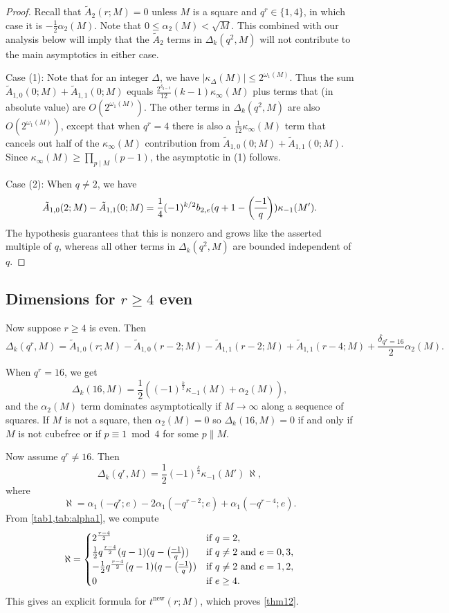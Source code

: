 \documentclass[11pt]{amsart}
\newcommand{\new}{\mathrm{new}}
\renewcommand{\mod}{\bmod}
\newcommand{\leg}{\overwithdelims ()}
\numberwithin{lem}{section}
\theoremstyle{remark}
\theoremstyle{definition}
\numberwithin{equation}{section}
\begin{document}
\begin {proof}
Recall that $\tilde A_2(r;M) = 0$ unless $M$ is a square and $q^r \in \{ 1, 4 \}$, in which case it is $- \frac 12 \alpha_2(M)$.  Note that $0 \le \alpha_2(M) < \sqrt M$.  This combined with our analysis below will imply that the
$\tilde A_2$ terms in $\Delta_k(q^2,M)$ will not contribute to the main asymptotics in either case.

Case (1): Note that for an integer $\Delta$, we have $\lvert \kappa_\Delta(M) \rvert \le 2^{\omega_1(M)}$.
Thus the sum $\tilde A_{1,0}(0;M) + \tilde A_{1,1}(0;M)$ equals
$\frac{2^{\delta_{q=2}}}{12} (k-1)\kappa_\infty(M)$ plus terms that (in absolute value) are $O(2^{\omega_1(M)})$.  The other terms in $\Delta_k(q^2,M)$ are also $O(2^{\omega_1(M)})$, except that when $q^r = 4$ there is also a $\frac{1}{12} \kappa_\infty(M)$ term that cancels out half of the $\kappa_\infty(M)$ contribution from $\tilde A_{1,0}(0;M) + \tilde A_{1,1}(0;M)$.  Since $\kappa_\infty(M) \ge \prod_{p \mid M} (p-1)$, the asymptotic in (1) follows.

Case (2): 
When $q \ne 2$, we have
\[ \tilde A_{1,0}(2;M) - \tilde A_{1,1}(0;M) = \frac 14 (-1)^{k/2} b_{2,e} (q + 1 - {-1 \leg q}) \kappa_{-1}(M'). \]
The hypothesis guarantees that this is nonzero and grows like the asserted multiple of $q$, whereas all other terms in $\Delta_k(q^2,M)$ are bounded independent of $q$.
\end{proof}

\subsection{Dimensions for $r \ge 4$ even}
Now suppose $r \ge 4$ is even.  Then
\[ \Delta_k(q^r,M) =  \tilde A_{1,0}(r;M) - \tilde A_{1,0}(r-2;M) - \tilde A_{1,1}(r-2;M) 
+ \tilde A_{1,1}(r-4;M) + \frac{\delta_{q^r = 16}}2 \alpha_2(M). \]

When $q^r = 16$, we get
\[ \Delta_k(16,M) = \frac 12 \left( (-1)^{\frac k2} \kappa_{-1}(M) + \alpha_2(M) \right), \]  and the $\alpha_2(M)$ term dominates asymptotically if $M \to \infty$ along a sequence of squares.  If $M$ is not a square, then $\alpha_2(M) = 0$ so $\Delta_k(16,M) = 0$ if and only if $M$ is not cubefree or if $p \equiv 1 \mod 4$ for some $p \parallel M$.


Now assume $q^r \ne 16$.  Then
\[ \Delta_k(q^r,M) = \frac 12 (-1)^{\frac k2} \kappa_{-1}(M') \, \aleph, \]
where
\[ \aleph = \alpha_1(-q^r; e) - 2 \alpha_1(-q^{r-2}; e) + \alpha_1(-q^{r-4}; e). \]
From \cref{tab1,tab:alpha1}, we compute
\[ \aleph =
\begin{cases}
2^{\frac{r-4}2} & \text{if }q = 2, \\
\frac 12 q^{\frac{r-4}2} (q-1)(q-{-1 \leg q}) & \text{if }q \ne 2 \text{ and } e = 0, 3, \\
- \frac 12 q^{\frac{r-4}2} (q-1)(q-{-1 \leg q})& \text{if }q \ne 2 \text{ and } e = 1, 2, \\
0 & \text{if }e \ge 4.
\end{cases} \]
This gives an explicit formula for $t^\new(r;M)$, which proves \cref{thm12}.
\end{document}

